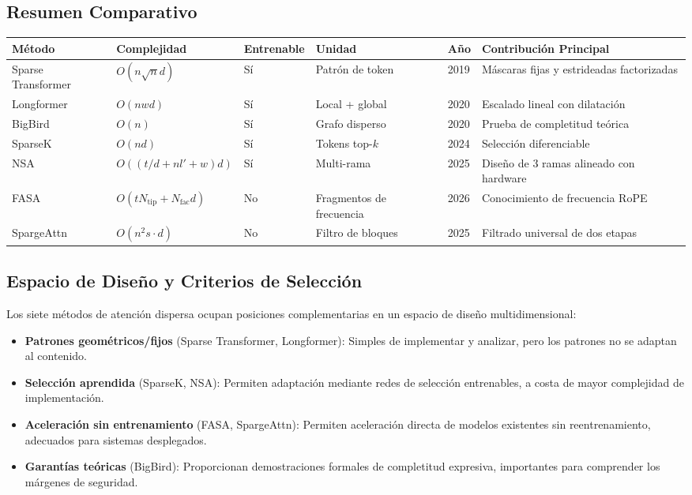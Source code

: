 \documentclass[11pt,a4paper]{article}
\begin{document}
\subsection{Resumen Comparativo}

\footnotesize
\begin{longtable}{p{1.9cm}p{1.7cm}p{1.6cm}p{1.6cm}p{1.1cm}p{3.5cm}}
\toprule
\textbf{Método} & \textbf{Complejidad} & \textbf{Entrenable} & \textbf{Unidad} & \textbf{Año} & \textbf{Contribución Principal} \\
\midrule
\endhead
Sparse Transformer & $O(n\sqrt{n}d)$ & Sí & Patrón de token & 2019 & Máscaras fijas y estrideadas factorizadas \\
Longformer & $O(nwd)$ & Sí & Local + global & 2020 & Escalado lineal con dilatación \\
BigBird & $O(n)$ & Sí & Grafo disperso & 2020 & Prueba de completitud teórica \\
SparseK & $O(nd)$ & Sí & Tokens top-$k$ & 2024 & Selección diferenciable \\
NSA & $O((t/d+nl'+w)d)$ & Sí & Multi-rama & 2025 & Diseño de 3 ramas alineado con hardware \\
FASA & $O(tN_{\text{tip}}+N_{\text{fac}}d)$ & No & Fragmentos de frecuencia & 2026 & Conocimiento de frecuencia RoPE \\
SpargeAttn & $O(n^2 s \cdot d)$ & No & Filtro de bloques & 2025 & Filtrado universal de dos etapas \\
\bottomrule
\end{longtable}
\normalsize

\subsection{Espacio de Diseño y Criterios de Selección}

Los siete métodos de atención dispersa ocupan posiciones complementarias en un espacio de diseño multidimensional:

\begin{itemize}[leftmargin=*]
    \item \textbf{Patrones geométricos/fijos} (Sparse Transformer, Longformer): Simples de implementar y analizar, pero los patrones no se adaptan al contenido.
    \item \textbf{Selección aprendida} (SparseK, NSA): Permiten adaptación mediante redes de selección entrenables, a costa de mayor complejidad de implementación.
    \item \textbf{Aceleración sin entrenamiento} (FASA, SpargeAttn): Permiten aceleración directa de modelos existentes sin reentrenamiento, adecuados para sistemas desplegados.
    \item \textbf{Garantías teóricas} (BigBird): Proporcionan demostraciones formales de completitud expresiva, importantes para comprender los márgenes de seguridad.
\end{itemize}
\end{document}
